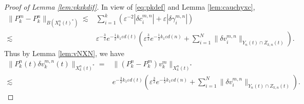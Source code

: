 \documentclass[11pt]{amsart}
\theoremstyle{remark}
\numberwithin{equation}{section}
\begin{document}
\begin{proof}[Proof of Lemma \ref{lem:vkxkdif}]
In view of \eqref{eq:pkdef} and Lemma \ref{lem:cauchyxc},
\begin{equation}
  \label{eq:difpro}
  \begin{split}
\|P_k^m-P_k^n\|_{B(X_k^n(t)^*)} \lesssim & \sum_{i=1}^k({\varepsilon}^{-2}|{\delta c}^{m,n}_i|+{\varepsilon}|{\delta\gamma}^{m,n}_i|)
\\ \lesssim &  {\varepsilon}^{-\frac32}e^{-\frac12k_1{\varepsilon} d(t)} 
\left({\varepsilon}^{\frac32}e^{-\frac12k_1{\varepsilon} d(n)}
+\sum_{i=1}^N \|{\delta v}_i^{m,n}\|_{Y_n(t)\cap Z_{k,n}(t)}\right).
  \end{split}
\end{equation}
Thus by Lemma \ref{lem:vNXN}, we have
\begin{equation}
  \label{eq:difvmvnp}
  \begin{split}
\|P_k^n(t){\delta v}_k^{m,n}(t)\|_{X_k^n(t)^*}=&\|(P_k^n-P_k^m)v_k^m\|_{X_k^n(t)^*}
\\  \lesssim & e^{-\frac32k_1{\varepsilon} d(t)}
\left({\varepsilon}^{\frac32}e^{-\frac12k_1{\varepsilon} d(n)}+\sum_{i=1}^N \|{\delta v}_i^{m,n}\|_{Y_n(t)\cap Z_{k,n}(t)}
\right).\end{split}
\end{equation}
\par


\end{proof}
\end{document}
